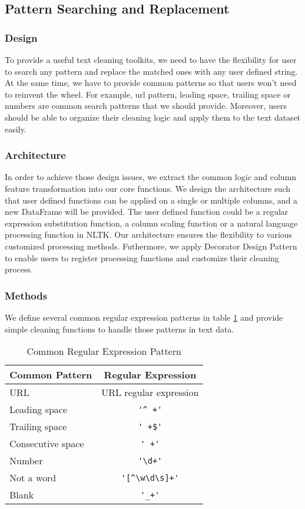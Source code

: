 \documentclass[sigconf]{acmart}
\begin{document}
\subsection{Pattern Searching and Replacement}
\subsubsection{Design} 
To provide a useful text cleaning toolkits, we need to have the flexibility for user to search any pattern and replace the matched ones with any user defined string. At the same time, we have to provide common patterns so that users won't need to reinvent the wheel. For example, url pattern, leading space, trailing space or numbers are common search patterns that we should provide. Moreover, users should be able to organize their cleaning logic and apply them to the text dataset easily.%

\subsubsection{Architecture}
In order to achieve those design issues, we extract the common logic and column feature transformation into our core functions. We design the architecture such that user defined functions can be applied on a single or multiple columns, and a new DataFrame will be provided. The user defined function could be a regular expression substitution function, a column scaling function or a natural language processing function in NLTK\cite{nltk}. Our architecture ensures the flexibility to various customized processing methods. Futhermore, we apply Decorator Design Pattern to enable users to register processing functions and customize their cleaning process.

\subsubsection{Methods}
We define several common regular expression patterns in table \ref{tab:reg} and provide simple cleaning functions to handle those patterns in text data.
\begin{table}
\caption{Common Regular Expression Pattern}   
\label{tab:reg}
\begin{tabular}{lc}
	Common Pattern & Regular Expression \\
\hline
	URL & URL regular expression\cite{url} \\
	Leading space & \verb!'^ +'! \\
	Trailing space & \verb!' +$'! \\
	Consecutive space & \verb!' +'! \\
	Number & \verb!'\d+'!  \\
	Not a word & \verb!'[^\w\d\s]+'! \\
	Blank & \verb!'_+'!
\end{tabular}   
\end{table}
\end{document}
